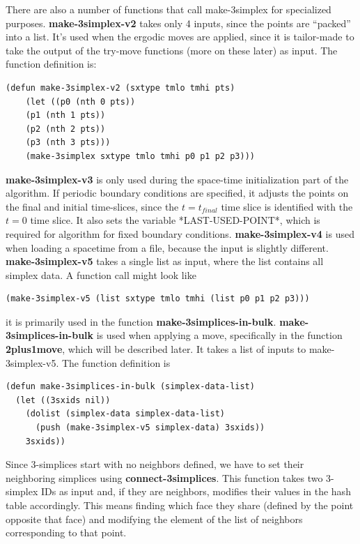 \message{ !name(programmers_guide.tex)}\documentclass[12pt]{article}
\begin{document}
There are also a number of functions that call make-3simplex for
specialized purposes. \textbf{make-3simplex-v2} takes only 4 inputs,
since the points are ``packed'' into a list. It's used when the
ergodic moves are applied, since it is tailor-made to take the output
of the try-move functions (more on these later) as input. The function
definition is:
\begin{lstlisting}
(defun make-3simplex-v2 (sxtype tmlo tmhi pts)
    (let ((p0 (nth 0 pts))
	(p1 (nth 1 pts))
	(p2 (nth 2 pts))
	(p3 (nth 3 pts)))
    (make-3simplex sxtype tmlo tmhi p0 p1 p2 p3)))
\end{lstlisting}
\textbf{make-3simplex-v3} is only used during the space-time
initialization part of the algorithm. If periodic boundary conditions
are specified, it adjusts the points on the final and initial
time-slices, since the $t=t_{final}$ time slice is identified with the
$t=0$ time slice. It also sets the variable *LAST-USED-POINT*, which
is required for algorithm for fixed boundary
conditions. \textbf{make-3simplex-v4} is used when loading a spacetime
from a file, because the input is slightly
different. \textbf{make-3simplex-v5} takes a single list as input,
where the list contains all simplex data. A function call might look like
\begin{lstlisting}
(make-3simplex-v5 (list sxtype tmlo tmhi (list p0 p1 p2 p3)))
\end{lstlisting}
it is primarily used in the function
\textbf{make-3simplices-in-bulk}. \textbf{make-3simplices-in-bulk} is
used when applying a move, specifically in the function
\textbf{2plus1move}, which will be described later. It takes a list of
inputs to make-3simplex-v5. The function definition is
\begin{lstlisting}
(defun make-3simplices-in-bulk (simplex-data-list)
  (let ((3sxids nil))
    (dolist (simplex-data simplex-data-list)
      (push (make-3simplex-v5 simplex-data) 3sxids))
    3sxids))
\end{lstlisting}

Since 3-simplices start with no neighbors defined, we have to set
their neighboring simplices using \textbf{connect-3simplices}. This
function takes two 3-simplex IDs as input and, if they are neighbors,
modifies their values in the hash table accordingly. This means
finding which face they share (defined by the point opposite that
face) and modifying the element of the list of neighbors corresponding
to that point.
\end{document}
